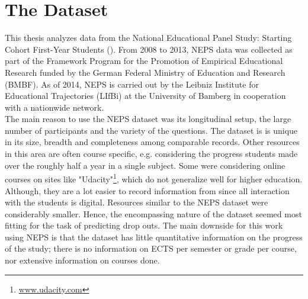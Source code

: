 
\section{The Dataset}
\label{sec:data}
This thesis analyzes data from the National Educational Panel Study: Starting Cohort First-Year Students (\cite{Weinert.}). From 2008 to 2013, NEPS data was collected as part of the Framework Program for the Promotion of Empirical Educational Research funded by the German Federal Ministry of Education and Research (BMBF). As of 2014, NEPS is carried out by the Leibniz Institute for Educational Trajectories (LIfBi) at the University of Bamberg in cooperation with a nationwide network.
\\
The main reason to use the NEPS dataset was its longitudinal setup, the large number of participants and the variety of the questions. The dataset is is unique in its size, breadth and completeness among comparable records. Other resources in this area are often course specific, e.g. considering the progress students made over the roughly half a year in a single subject. Some were considering online courses on sites like "Udacity"\footnote{\url{www.udacity.com}}, which do not generalize well for higher education. Although, they are a lot easier to record information from since all interaction with the students is digital. Resources similar to the NEPS dataset were considerably smaller. Hence, the encompassing nature of the dataset seemed most fitting for the task of predicting drop outs. The main downside for this work using NEPS is that the dataset has little quantitative information on the progress of the study; there is no information on ECTS per semester or grade per course, nor extensive information on courses done.
\\
